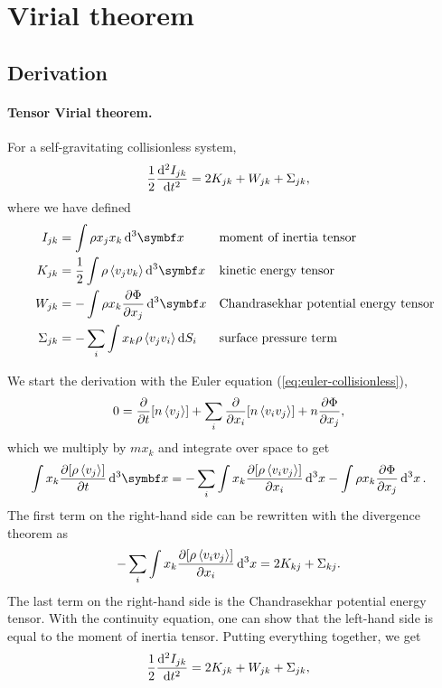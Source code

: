 \section{Virial theorem}

\subsection{Derivation}

\paragraph*{Tensor Virial theorem.}
For a self-gravitating collisionless system,
\begin{align*}
	\frac{1}{2}
	\dv[2]{I_{jk}}{t}
	&= 2 K_{jk} + W_{jk} + \Sigma_{jk},
\end{align*}
where we have defined
\begin{align*}
	I_{jk}
	&= \int \rho x_j x_k \dd{^3 \vec{x}}
	&&\text{moment of inertia tensor}\\
	K_{jk}
	&= \frac{1}{2} \int \rho \avg{v_j v_k} \dd{^3 \vec{x}}
	&&\text{kinetic energy tensor}\\
	W_{jk}
	&= - \int \rho x_k \pdv{\Phi}{x_j} \dd{^3 \vec{x}}
	&&\text{Chandrasekhar potential energy tensor}\\
	\Sigma_{jk}
	&= - \sum_i \int x_k \rho \avg{v_j v_i} \dd{S_i}
	&&\text{surface pressure term}
\end{align*}

We start the derivation with the Euler equation (\ref{eq:euler-collisionless}),
\begin{align*}
	0
	&= \pdv{}{t} [n \left\langle v_j \right\rangle]
	+ \sum_{i} \pdv{}{x_i} [n \left\langle v_i v_j \right\rangle]
	+ n \pdv{\Phi}{x_j},
\end{align*}
which we multiply by $m x_k$ and integrate over space to get
\begin{align*}
	\int x_k \pdv{[\rho\avg{v_j}]}{t} \dd{^3 \vec{x}}
	&= - \sum_i \int x_k \pdv{[\rho \avg{v_i v_j}]}{x_i} \dd{^3 x}
	- \int  \rho x_k \pdv{\Phi}{x_j} \dd{^3 x}.
\end{align*}
The first term on the right-hand side can be rewritten with the divergence theorem as
\begin{align*}
	- \sum_i \int x_k \pdv{[\rho \left\langle v_i v_j \right\rangle]}{x_i} \dd{^3 x}
	&= 2 K_{kj} + \Sigma_{kj}.
\end{align*}
The last term on the right-hand side is the Chandrasekhar potential energy tensor. With the continuity equation, one can show that the left-hand side is equal to the moment of inertia tensor. Putting everything together, we get
\begin{align*}
	\frac{1}{2}
	\dv[2]{I_{jk}}{t}
	&= 2 K_{jk} + W_{jk} + \Sigma_{jk},
\end{align*}


